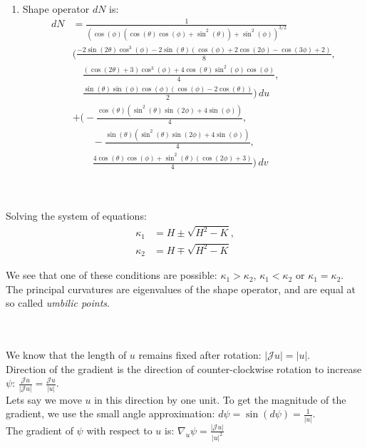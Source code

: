 \documentclass{article}
\newcommand\ifrac[2]{{\displaystyle\frac{#1}{#2}}}
\def\grad{\nabla}
\begin{document}
\begin{enumerate}[label=(\alph*)]
    \item
    Shape operator $dN$ is:
    \begin{align*}
        dN &= \frac{1}{\left(\cos (\phi ) \left(\cos (\theta ) \cos (\phi )+\sin ^2(\theta )\right)+\sin ^2(\phi )\right)^{3/2}}\\
            &\Big(
            \frac{-2 \sin (2 \theta ) \cos ^3(\phi )-2 \sin (\theta ) (\cos (\phi )+2 \cos (2 \phi )-\cos (3 \phi )+2)}{8},\\
            &\quad\frac{(\cos (2 \theta )+3) \cos ^3(\phi )+4 \cos (\theta ) \sin ^2(\phi ) \cos (\phi )}{4},\\
            &\quad\frac{\sin (\theta ) \sin (\phi ) \cos (\phi ) (\cos (\phi )-2 \cos (\theta ))}{2}
            \Big)\, du \\
            &+
            \Big(
            -\frac{\cos (\theta ) \left(\sin ^2(\theta ) \sin (2 \phi )+4 \sin (\phi )\right)}{4},\\
            &\quad\quad-\frac{\sin (\theta ) \left(\sin ^2(\theta ) \sin (2 \phi )+4 \sin (\phi )\right)}{4},\\
            &\quad\quad\frac{4 \cos (\theta ) \cos (\phi )+\sin ^2(\theta ) (\cos (2 \phi )+3)}{4}
            \Big)\, dv
    \end{align*}
\end{enumerate}


\pagebreak
{}\\\\


Solving the system of equations:
\begin{align*}
    \kappa_1 &= H \pm \sqrt{H^2 - K},\\ \kappa_2 &= H \mp \sqrt{H^2 - K}
\end{align*}

We see that one of these conditions are possible: $\kappa_1 > \kappa_2$, $\kappa_1 < \kappa_2$ or $\kappa_1 = \kappa_2$.\\
The principal curvatures are eigenvalues of the shape operator, and are equal at so called \emph{umbilic points}.


\vspace{1.8cm}
\\\\


We know that the length of $u$ remains fixed after rotation: $|\mathcal{J}u| = |u|$.\\
Direction of the gradient is the direction of counter-clockwise rotation to increase $\psi$: $\ifrac{\mathcal{J}u}{|\mathcal{J}u|} = \ifrac{\mathcal{J}u}{|u|}$.\\
Lets say we move $u$ in this direction by one unit. To get the magnitude of the gradient, we use the small angle approximation:
$d\psi = \sin(d\psi) = \ifrac{1}{|u|}$.\\
The gradient of $\psi$ with respect to $u$ is: $\grad_u\psi = \ifrac{|\mathcal{J}u|}{|u|^2}$
\end{document}
